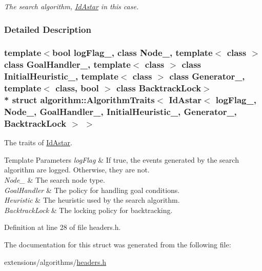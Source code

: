 \begin{DoxyCompactItemize}
\begin{DoxyCompactList}\small\item\em The search algorithm, \hyperlink{structIdAstar}{Id\+Astar} in this case. \end{DoxyCompactList}\end{DoxyCompactItemize}


\subsubsection{Detailed Description}
\subsubsection*{template$<$bool log\+Flag\+\_\+, class Node\+\_\+, template$<$ class $>$ class Goal\+Handler\+\_\+, template$<$ class $>$ class Initial\+Heuristic\+\_\+, template$<$ class $>$ class Generator\+\_\+, template$<$ class, bool $>$ class Backtrack\+Lock$>$\\*
struct algorithm\+::\+Algorithm\+Traits$<$ Id\+Astar$<$ log\+Flag\+\_\+, Node\+\_\+, Goal\+Handler\+\_\+, Initial\+Heuristic\+\_\+, Generator\+\_\+, Backtrack\+Lock $>$ $>$}

The traits of \hyperlink{structIdAstar}{Id\+Astar}. 


\begin{DoxyTemplParams}{Template Parameters}
{\em log\+Flag} & If {\ttfamily true}, the events generated by the search algorithm are logged. Otherwise, they are not. \\
\hline
{\em Node\+\_\+} & The search node type. \\
\hline
{\em Goal\+Handler} & The policy for handling goal conditions. \\
\hline
{\em Heuristic} & The heuristic used by the search algorithm. \\
\hline
{\em Backtrack\+Lock} & The locking policy for backtracking. \\
\hline
\end{DoxyTemplParams}


Definition at line 28 of file headers.\+h.



The documentation for this struct was generated from the following file\+:\begin{DoxyCompactItemize}
\item 
extensions/algorithms/\hyperlink{extensions_2algorithms_2headers_8h}{headers.\+h}\end{DoxyCompactItemize}
